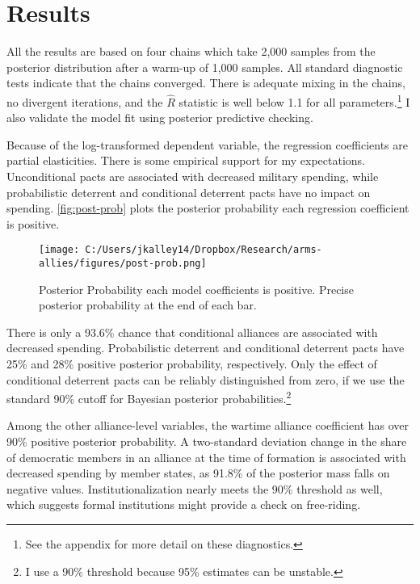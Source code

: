 \documentclass[12pt]{article}
\begin{document}
\section*{Results} 

All the results are based on four chains which take 2,000 samples from the posterior distribution after a warm-up of 1,000 samples. All standard diagnostic tests indicate that the chains converged. There is adequate mixing in the chains, no divergent iterations, and the $\hat{R}$ statistic is well below 1.1 for all parameters.\footnote{See the appendix for more detail on these diagnostics.} I also validate the model fit using posterior predictive checking. 

Because of the log-transformed dependent variable, the regression coefficients are partial elasticities. There is some empirical support for my expectations. Unconditional pacts are associated with decreased military spending, while probabilistic deterrent and conditional deterrent pacts have no impact on spending. \autoref{fig:post-prob} plots the posterior probability each regression coefficient is positive. 

\begin{figure}[htbp]
	\centering
  \texttt{[image: C:/Users/jkalley14/Dropbox/Research/arms-allies/figures/post-prob.png]}
	\caption{Posterior Probability each model coefficients is positive. Precise posterior probability at the end of each bar.}
	\label{fig:post-prob}
\end{figure}


There is only a 93.6\% chance that conditional alliances are associated with decreased spending. Probabilistic deterrent and conditional deterrent pacts have 25\% and 28\% positive posterior probability, respectively. Only the effect of conditional deterrent pacts can be reliably distinguished from zero, if we use the standard 90\% cutoff for Bayesian posterior probabilities.\footnote{I use a 90\% threshold because 95\% estimates can be unstable.}

Among the other alliance-level variables, the wartime alliance coefficient has over 90\% positive posterior probability. A two-standard deviation change in the share of democratic members in an alliance at the time of formation is associated with decreased spending by member states, as 91.8\% of the posterior mass falls on negative values. Institutionalization nearly meets the 90\% threshold as well, which suggests formal institutions might provide a check on free-riding. 
\end{document}
